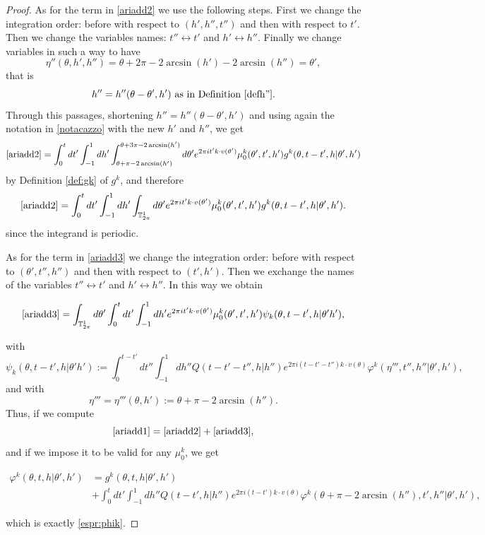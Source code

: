 \documentclass[a4paper,10pt,reqno]{amsart}
\numberwithin{equation}{subsection}
\numberwithin{figure}{subsection}
\begin{document}
\begin{proof}
As for the term in \eqref{ariadd2} we use the following steps. First we change the integration order: before with respect to $(h',h'',t'')$ and then with respect to $t'$. Then we change the variables names: $t''\leftrightarrow t'$ and $h'\leftrightarrow h''$. Finally we change variables in such a way to have
\[
\eta''(\theta,h',h'')=\theta+2\pi-2\arcsin(h')-2\arcsin(h'')=\theta',
\]
that is 
\[
h''=h''(\theta-\theta',h')\textrm{ as in Definition \ref{defh''}.}
\]
Through this passages, shortening $h''=h''(\theta-\theta',h')$ and using again the notation in \eqref{notacazzo} with the new $h'$ and $h''$, we get
\[
\eqref{ariadd2}=\int_0^tdt'\int_{-1}^1dh'\int_{\theta+\pi-2\arcsin(h')}^{\theta+3\pi-2\arcsin(h')}d\theta'e^{2\pi it' k\cdot v(\theta')}\mu_0^k(\theta',t',h')g^k(\theta,t-t',h|\theta',h')
\]
by Definition \ref{def:gk} of $g^k$, and therefore
\[
\eqref{ariadd2}=\int_0^tdt'\int_{-1}^1dh'\int_{\mathbb{T}^1_{2\pi}}d\theta'e^{2\pi it' k\cdot v(\theta')}\mu_0^k(\theta',t',h')g^k(\theta,t-t',h|\theta',h').
\]
since the integrand is periodic.

As for the term in \eqref{ariadd3} we change the integration order: before with respect to $(\theta',t'',h'')$ and then with respect to $(t',h')$. Then we exchange the names of the variables $t''\leftrightarrow t'$ and $h'\leftrightarrow h''$. In this way we obtain

\begin{align*}
\eqref{ariadd3}=\int_{\mathbb{T}^1_{2\pi}}d\theta'\int_0^tdt'\int_{-1}^1dh'e^{2\pi it' k\cdot v(\theta')}\mu_0^k(\theta',t',h')\psi_k(\theta,t-t',h|\theta'h'),
\end{align*}

with
{\footnotesize\[
\psi_k(\theta,t-t',h|\theta'h'):=\int_0^{t-t'}dt''\int_{-1}^1dh''Q(t-t'-t'',h|h'')e^{2\pi i(t-t'-t'')k\cdot v(\theta)}\varphi^k(\eta''',t'',h''|\theta',h'),
\]}
and with
\[
\eta'''=\eta'''(\theta,h'):=\theta+\pi-2\arcsin(h'').
\]
Thus, if we compute 
\[
\eqref{ariadd1}=\eqref{ariadd2}+\eqref{ariadd3},
\]
and if we impose it to be valid for any $\mu_0^k$, we get

{\scriptsize\begin{align*}
\varphi^k(\theta,t,h|\theta',h')&=g^k(\theta,t,h|\theta',h')
\\
&+\int_0^tdt'\int_{-1}^1dh''Q(t-t',h|h'')e^{2\pi i(t-t')k\cdot v(\theta)}\varphi^k(\theta+\pi-2\arcsin(h''),t',h''|\theta',h'),
\end{align*}}

which is exactly \eqref{espr:phik}.


\end{proof}
\end{document}
